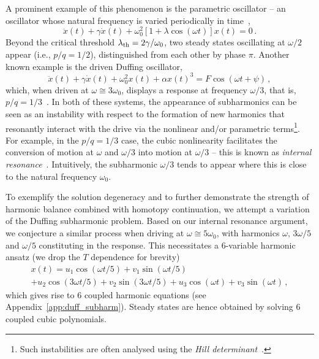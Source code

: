 A prominent example of this phenomenon is the parametric oscillator -- an oscillator whose natural frequency is varied periodically in time~\cite{Rand_2005, Papariello_2016},
\begin{equation}
\ddot{x}(t) + \gamma \dot {x}(t) + \omega_0^2 \left[1 + \lambda \cos(\omega t)\right] x(t) = 0\,.
\end{equation}
Beyond the critical threshold $\lambda_{\rm th} = 2 \gamma / \omega_0$, two steady states oscillating at $\omega/2$ appear (i.e., $p/q = 1/2$), distinguished from each other by phase $\pi$. Another known example is the driven Duffing oscillator,
\begin{equation} \label{eq:hopf_duffing}
\ddot{x}(t) + \gamma \dot{x}(t) + \omega_0^2 x(t) + \alpha x(t)^3 = F \cos(\omega t + \psi) \,,
\end{equation}
which, when driven at $\omega \cong 3 \omega_0$, displays a response at frequency $\omega/3$, that is, $p/q=1/3$~\cite{Arndt_2022, Jordan_Smith}. In both of these systems, the appearance of subharmonics can be seen as an instability with respect to the formation of new harmonics that resonantly interact with the drive via the nonlinear and/or parametric terms\footnote{Such instabilities are often analysed using the \textit{Hill determinant}~\cite{Richards}.}. For example, in the $p/q = 1/3$ case, the cubic nonlinearity facilitates the conversion of motion at $\omega$ and $\omega/3$ into motion at $\omega/3$ -- this is known as \textit{internal resonance}~\cite{Nayfeh_Mook, Manevich}. Intuitively, the subharmonic $\omega/3$ tends to appear where this is close to the natural frequency $\omega_0$. 

To exemplify the solution degeneracy and to further demonstrate the strength of harmonic balance combined with homotopy continuation, we attempt a variation of the Duffing subharmonic problem. Based on our internal resonance argument, we conjecture a similar process when driving at $\omega \cong 5 \omega_0$, with harmonics $\omega,\, 3\omega/5$ and $\omega /5$ constituting in the response. This necessitates a 6-variable harmonic ansatz (we drop the $T$ dependence for brevity)
\begin{multline} \label{eq:hopf_5_ansatz}
x(t) = u_1 \cos(\omega t / 5) + v_1 \sin(\omega t / 5) \\
+ u_2 \cos(3\omega t / 5) + v_2 \sin(3\omega t / 5) +  u_3 \cos(\omega t) + v_3 \sin(\omega t) \,,
\end{multline}
which gives rise to 6 coupled harmonic equations (see Appendix~\ref{app:duff_subharm}). Steady states are hence obtained by solving 6 coupled cubic polynomials. 

